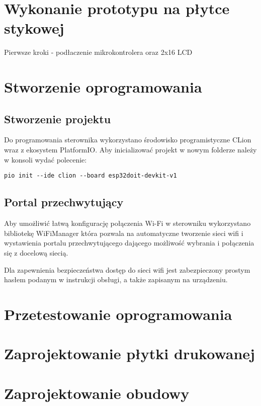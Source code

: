 \documentclass[12pt]{report}
\begin{document}
 \chapter{Wykonanie prototypu na płytce stykowej}
 Pierwsze kroki - podłaczenie mikrokontrolera oraz 2x16 LCD
 
 \chapter{Stworzenie oprogramowania}\label{rozdz.stworzenie}
 
 \section{Stworzenie projektu}
 Do programowania sterownika wykorzystano środowisko programistyczne CLion wraz z ekosystem PlatformIO.
 Aby inicializować projekt w nowym folderze należy w konsoli wydać polecenie:
 \begin{lstlisting}
pio init --ide clion --board esp32doit-devkit-v1 
 \end{lstlisting}
 
 
 
 \section{Portal przechwytujący}
 Aby umożliwić łatwą konfigurację połączenia Wi-Fi w sterowniku wykorzystano bibliotekę WiFiManager która pozwala na automatyczne tworzenie sieci wifi i wystawienia portalu przechwytującego dającego możliwość wybrania i połączenia się z docelową siecią. 
 
 Dla zapewnienia bezpieczeństwa dostęp do sieci wifi jest zabezpieczony prostym hasłem podanym w instrukcji obsługi, a także zapisanym na urządzeniu.
 
 
 
 
 
 \chapter{Przetestowanie oprogramowania}
 
 \chapter{Zaprojektowanie płytki drukowanej}
 
 \chapter{Zaprojektowanie obudowy}
 
\end{document}
